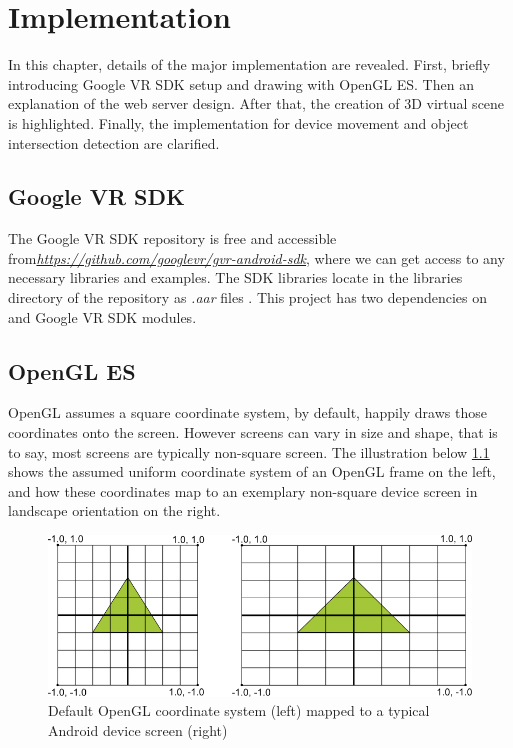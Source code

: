 \label{chapter-implementation}
\chapter{Implementation}

In this chapter, details of the major implementation are revealed. First, briefly introducing Google VR SDK setup and drawing with OpenGL ES. Then an explanation of the web server design. After that, the creation of 3D virtual scene is highlighted. Finally, the implementation for device movement and object intersection detection are  clarified.

\section{Google VR SDK}

The Google VR SDK repository is free and accessible from\href{https://github.com/googlevr/gvr-android-sdk}{\emph{https://github.com/googlevr/gvr-android-sdk}}, where we can get access to any necessary libraries and examples. The SDK libraries locate in the libraries directory of the repository as \emph{.aar} files \cite{google.aar-format.2016}. This project has two dependencies on  and  Google VR SDK modules.

\section{OpenGL ES}

OpenGL assumes a square coordinate system, by default, happily draws those coordinates onto the screen. However screens can vary in size and shape, that is to say, most screens are typically non-square screen. The illustration below \ref{fig:opengl-coordinates} shows the assumed uniform coordinate system of an OpenGL frame on the left, and how these coordinates map to an exemplary non-square device screen in landscape orientation on the right.

\begin{figure}[H]
\caption[OpenGL coordinate system mapping]{Default OpenGL coordinate system (left) mapped to a typical Android device screen (right) \cite{google.opengles.2016}}
\label{fig:opengl-coordinates}
\centering
\includegraphics[width=\textwidth, keepaspectratio]{Figures/opengl-coordinates.png}
\decoRule
\end{figure}

